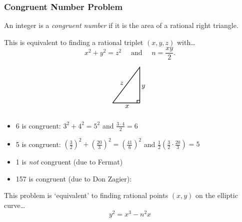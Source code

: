 \begin{frame}[plain]
\end{frame}



\begin{frame} \frametitle{Congruent Number Problem} \scriptsize
An integer is a \textit{congruent number} if it is the area of a rational right triangle. \par\vspace{0.5\baselineskip}

\begin{minipage}{0.5\textwidth}
This is equivalent to finding a rational triplet $(x,y,z)$ with\dots
	\[
	x^2 + y^2= z^2 \quad \text{ and } \quad n= \dfrac{xy}{2}.
	\] 
\end{minipage}\begin{minipage}{0.5\textwidth}
\end{minipage}\begin{minipage}{0.5\textwidth}
	\[
	\begin{tikzpicture}[scale=0.9]
	\draw[line width=0.03cm] (0,0) -- (1.5,0) -- (1.5,2) -- (0,0);
	\draw[line width=0.03cm] (1.35,0) -- (1.35,0.15) -- (1.5,0.15);
	\node at (0.8,-0.2) {$x$};
	\node at (1.7,0.9) {$y$};
	\node at (0.5,1.1) {$z$};
	\end{tikzpicture}
	\]
\end{minipage}

\begin{ex}
\begin{itemize} \scriptsize
\item 6 is congruent: $3^2 + 4^2= 5^2$ and $\frac{3 \cdot 4}{2} = 6$
\item 5 is congruent: $\left( \frac{3}{2} \right)^2 + \left( \frac{20}{3} \right)^2= \left( \frac{41}{6} \right)^2$ and $\frac{1}{2} \left( \frac{3}{2} \cdot \frac{20}{3} \right)= 5$
\item 1 is \emph{not} congruent (due to Fermat) 
\item 157 is congruent (due to Don Zagier): \par\vspace{0.1cm}
\end{itemize}
\end{ex}

This problem is `equivalent' to finding rational points $(x, y)$ on the elliptic curve\dots
	\[
	y^2 = x^3 - n^2x
	\]

\end{frame}



